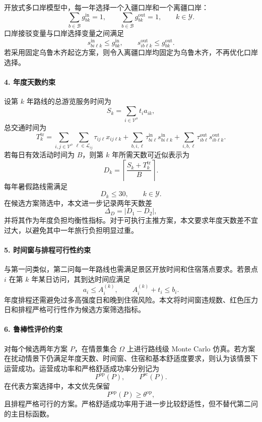 \documentclass[UTF8,zihao=-4,a4paper]{ctexart}
\begin{document}
开放式多口岸模型中，每一年选择一个入疆口岸和一个离疆口岸：
\[
\sum_{b\in\mathcal{B}}g_{bk}^{\mathrm{in}}=1,
\qquad
\sum_{b\in\mathcal{B}}g_{bk}^{\mathrm{out}}=1,
\qquad k\in\mathcal{Y}.
\]
口岸接驳变量与口岸选择变量之间满足
\[
s_{bi\ell k}^{\mathrm{in}}\leq g_{bk}^{\mathrm{in}},
\qquad
s_{ib\ell k}^{\mathrm{out}}\leq g_{bk}^{\mathrm{out}}.
\]
若采用固定乌鲁木齐起讫方案，则令入离疆口岸均固定为乌鲁木齐，不再优化口岸选择。

\paragraph{4. 年度天数约束}

设第 $k$ 年路线的总游览服务时间为
\[
S_k=\sum_{i\in\mathcal{V}^{o}} t_i a_{ik},
\]
总交通时间为
\[
T_k^{\mathrm{tr}}
=
\sum_{i,j\in\mathcal{V}^{o}}
\sum_{\ell\in\mathcal{L}_{ij}}
\tau_{ij\ell}x_{ij\ell k}
+
\sum_{b,i,\ell}\tau_{bi\ell}^{\mathrm{in}}s_{bi\ell k}^{\mathrm{in}}
+
\sum_{i,b,\ell}\tau_{ib\ell}^{\mathrm{out}}s_{ib\ell k}^{\mathrm{out}}.
\]
若每日有效活动时间为 $B$，则第 $k$ 年所需天数可近似表示为
\[
D_k
=
\left\lceil
\frac{S_k+T_k^{\mathrm{tr}}}{B}
\right\rceil .
\]
每年暑假路线需满足
\[
D_k\leq 30,
\qquad k\in\mathcal{Y}.
\]
在候选方案筛选中，本文进一步记录两年天数差
\[
\Delta_D=|D_1-D_2|,
\]
并将其作为年度负担均衡性指标。对于可执行主推方案，本文要求年度天数差不宜过大，以避免其中一年旅行负担明显过重。

\paragraph{5. 时间窗与排程可行性约束}

与第一问类似，第二问每一年路线也需满足景区开放时间和住宿落点要求。若景点 $i$ 在第 $k$ 年某日访问，其到达时间应满足
\[
a_i \leq A_i^{(k)},\qquad
A_i^{(k)}+t_i\leq b_i.
\]
年度排程还需避免过多高强度日和晚到住宿风险。本文将时间窗违规数、红色压力日和排程严格可行性作为候选方案筛选指标。

\paragraph{6. 鲁棒性评价约束}

对每个候选两年方案 $P$，在情景集合 $\Omega$ 上进行路线级 Monte Carlo 仿真。若方案在扰动情景下仍满足年度天数、时间窗、住宿和基本舒适度要求，则认为该情景下运营成功。运营成功率和严格舒适成功率分别记为
\[
P^{\mathrm{op}}(P),
\qquad
P^{\mathrm{sc}}(P).
\]
在代表方案选择中，本文优先保留
\[
P^{\mathrm{op}}(P)\geq \theta^{\mathrm{op}},
\]
且排程严格可行的方案。严格舒适成功率用于进一步比较舒适性，但不替代第二问的主目标函数。
\end{document}
